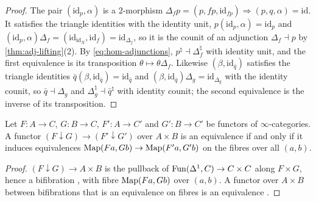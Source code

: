 \begin{proof}
%
The pair
$(\mathrm{id}_{p},\alpha)$
is a $2$-morphism
$\Delta_{f}p = (p,fp,\mathrm{id}_{fp}) \Rightarrow (p,q,\alpha) = \mathrm{id}$.
It satisfies the triangle identities with the identity unit,
$p(\mathrm{id}_{p},\alpha) = \mathrm{id}_{p}$
and
$(\mathrm{id}_{p},\alpha)\Delta_{f} = (\mathrm{id}_{\mathrm{id}_{X}},
\mathrm{id}_{f}) = \mathrm{id}_{\Delta_{f}}$,
so it is the counit of an adjunction
$\Delta_{f} \dashv p$
by \cref{thm:adj-lifting}(2). By \eqref{eq:hom-adjunctions},
$p^{\natural} \dashv \Delta_{f}^{\natural}$
with identity unit, and the first equivalence is its transposition
$\theta \mapsto \theta\Delta_{f}$.
Likewise
$(\beta,\mathrm{id}_{\bar q})$
satisfies the triangle identities
$\bar q(\beta,\mathrm{id}_{\bar q}) = \mathrm{id}_{\bar q}$
and
$(\beta,\mathrm{id}_{\bar q})\Delta_{g} = \mathrm{id}_{\Delta_{g}}$
with the identity counit, so
$\bar q \dashv \Delta_{g}$
and
$\Delta_{g}^{\natural} \dashv \bar q^{\natural}$
with identity counit; the second equivalence is the inverse of its
transposition.
\end{proof}

\begin{lem}
\label{lem:comma-fibrewise}
%
Let $F\colon A \to C$, $G\colon B \to C$,
$F'\colon A \to C'$ and $G'\colon B \to C'$ be functors of $\infty$-categories.
A functor
$(F \downarrow G) \to (F' \downarrow G')$
over $A \times B$ is an equivalence if and only if it induces equivalences
$\operatorname{Map}(Fa,Gb) \to \operatorname{Map}(F'a,G'b)$
on the fibres over all $(a,b)$.
\end{lem}

\begin{proof}
%
$(F \downarrow G) \to A \times B$
is the pullback of
$\operatorname{Fun}(\Delta^{1},C) \to C \times C$
along $F \times G$, hence a bifibration \cite[Cor.~2.4.7.11]{htt},
with fibre $\operatorname{Map}(Fa,Gb)$ over $(a,b)$. A functor over $A \times B$ between
bifibrations that is an equivalence on fibres is an equivalence
\cite[Prop.~2.4.7.6]{htt}.
\end{proof}

